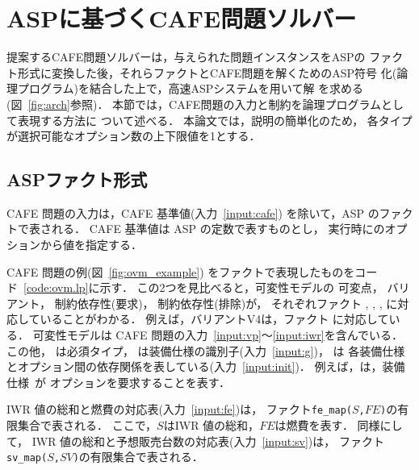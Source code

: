 \section{ASPに基づくCAFE問題ソルバー}

提案するCAFE問題ソルバーは，与えられた問題インスタンスをASPの
ファクト形式に変換した後，それらファクトとCAFE問題を解くためのASP符号
化(論理プログラム)を結合した上で，高速ASPシステム{\clingo}を用いて解
を求める(図~\ref{fig:arch}参照)．
本節では，CAFE問題の入力と制約を論理プログラムとして表現する方法に
ついて述べる．
本論文では，説明の簡単化のため，
各タイプが選択可能なオプション数の上下限値を1とする．


\subsection{ASPファクト形式}

 

CAFE 問題の入力は，CAFE 基準値(入力~\ref{input:cafe})
を除いて，ASP のファクトで表される．
CAFE 基準値は ASP の定数で表すものとし，
実行時に{\clingo}のオプションから値を指定する．

CAFE 問題の例(図~\ref{fig:ovm_example})
をファクトで表現したものをコード~\ref{code:ovm.lp}に示す．
この2つを見比べると，可変性モデルの
可変点，
バリアント，
制約依存性(要求)，
制約依存性(排除)が，
それぞれファクト
, 
,
,
に対応していることがわかる．
例えば，バリアント\textsf{V4}は，ファクト
に対応している．
%
可変性モデルは CAFE 問題の入力~\ref{input:vp}〜\ref{input:iwr}を含んでいる．
%
この他，
は必須タイプ，
は装備仕様の識別子(入力~\ref{input:g})，
は
各装備仕様とオプション間の依存関係を表している(入力~\ref{input:init})．
例えば，は，装備仕様~が
オプションを要求することを表す．

IWR 値の総和と燃費の対応表(入力~\ref{input:fe})は，
ファクト\texttt{fe\_map($S$,$FE$)}の有限集合で表される．
ここで，$S$はIWR 値の総和，$FE$は燃費を表す．
同様にして，
IWR 値の総和と予想販売台数の対応表(入力~\ref{input:sv})は，
ファクト\texttt{sv\_map($S$,$SV$)}の有限集合で表される．

